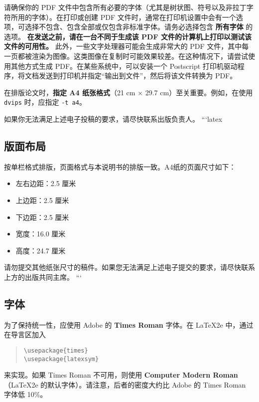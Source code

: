 \documentclass[11pt]{article}
\begin{document}
\begin{CJK*}{UTF8}{gbsn}
请确保你的 PDF 文件中包含所有必要的字体（尤其是树状图、符号以及非拉丁字符所用的字体）。在打印或创建 PDF 文件时，通常在打印机设置中会有一个选项，可选择不包含、包含全部或仅包含非标准字体。请务必选择包含 \textbf{所有字体} 的选项。 \textbf{在发送之前，请在一台不同于生成该 PDF 文件的计算机上打印以测试该文件的可用性。} 此外，一些文字处理器可能会生成非常大的 PDF 文件，其中每一页都被渲染为图像。这类图像在复制时可能效果较差。在这种情况下，请尝试使用其他方式生成 PDF。在某些系统中，可以安装一个 Postscript 打印机驱动程序，将文档发送到打印机并指定“输出到文件”，然后将该文件转换为 PDF。

在排版论文时，\textbf{指定 A4 纸张格式}（21 cm × 29.7 cm）至关重要。例如，在使用 {\tt dvips} 时，应指定 {\tt -t a4}。

如果你无法满足上述电子投稿的要求，请尽快联系出版负责人。
```latex
\subsection{版面布局}
\label{ssec:layout}

按单栏格式排版，页面格式与本说明书的排版一致。A4纸的页面尺寸如下：

\begin{itemize}
\item 左右边距：2.5 厘米
\item 上边距：2.5 厘米
\item 下边距：2.5 厘米
\item 宽度：16.0 厘米
\item 高度：24.7 厘米
\end{itemize}

\noindent 请勿提交其他纸张尺寸的稿件。如果您无法满足上述电子提交的要求，请尽快联系上方的出版共同主席。
```
\subsection{字体}

为了保持统一性，应使用 Adobe 的 {\bf Times Roman} 字体。在 \LaTeX2e{} 中，通过在导言区加入

\begin{quote}
\begin{verbatim}
\usepackage{times}
\usepackage{latexsym}
\end{verbatim}
\end{quote}
来实现。如果 Times Roman 不可用，则使用 {\bf Computer Modern Roman}（\LaTeX2e{} 的默认字体）。请注意，后者的密度大约比 Adobe 的 Times Roman 字体低 10\%。 


\end{CJK*}
\end{document}
